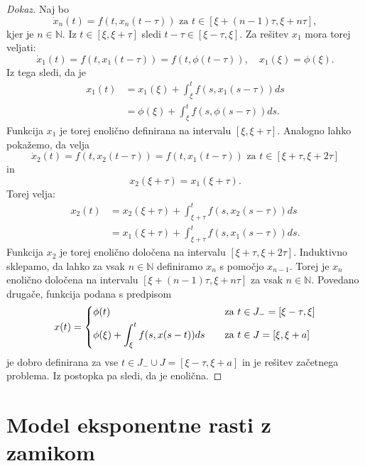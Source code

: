 \documentclass[12pt,a4paper]{amsart}
\theoremstyle{definition} %
\theoremstyle{plain} %
\newcommand{\N}{\mathbb N}
\begin{document}
\begin{proof}[Dokaz]
    Naj bo \[\dot{x}_n(t)=f(t,x_{n}(t-\tau)) \text{ za } t \in [\xi + (n-1)\tau,\xi + n\tau],\]
    kjer je $n \in \N$.
    Iz $t \in [\xi, \xi + \tau]$ sledi $t-\tau \in [\xi - \tau, \xi]$. Za rešitev $x_{1}$ mora torej veljati:
    \[\dot{x}_1(t)=f(t,x_{1}(t-\tau))=f(t,\phi(t-\tau)),\quad x_{1}(\xi)=\phi(\xi).\]
    Iz tega sledi, da je
    \begin{equation*}
        \begin{split}
            x_{1}(t) &= x_{1}(\xi) + \int_{\xi}^{t}f(s, x_{1}(s-\tau))ds \\
            & = \phi(\xi) + \int_{\xi}^{t}f(s,\phi(s-\tau))ds.
        \end{split}      
        \end{equation*}
    Funkcija $x_{1}$ je torej enolično definirana na intervalu $[\xi, \xi + \tau]$. Analogno lahko pokažemo, da velja
    \[\dot{x}_2(t)=f(t,x_{2}(t-\tau))=f(t,x_{1}(t-\tau)) \text{ za } t \in [\xi + \tau, \xi + 2\tau]\] in 
    \[x_{2}(\xi + \tau)=x_{1}(\xi + \tau).\]
    Torej velja:
    \begin{equation*}
        \begin{split}
            x_{2}(t) &= x_{2}(\xi + \tau) + \int_{\xi + \tau}^{t}f(s, x_{2}(s-\tau))ds \\
            & = x_{1}(\xi + \tau) + \int_{\xi + \tau}^{t}f(s, x_{1}(s-\tau))ds.
        \end{split}      
        \end{equation*}
    Funkcija $x_{2}$ je torej enolično določena na intervalu $[\xi + \tau,\xi + 2\tau]$. Induktivno sklepamo, da lahko za vsak 
    $n \in \N$ definiramo $x_{n}$ s pomočjo $x_{n-1}$. Torej je $x_{n}$ enolično določena na intervalu 
    $[\xi + (n-1)\tau, \xi + n\tau]$ za vsak $n \in \N$. Povedano drugače, funkcija podana s predpisom
    \[
        x(t) =
        \begin{dcases}
            \phi(t) &\quad \text{za  } t \in J_{-}=[\xi - \tau, \xi] \\
            \phi(\xi) + \int_{\xi}^{t}f(s,x(s-t))ds &\quad \text{za  } t \in J=[\xi, \xi +a] \\
        \end{dcases}
    \]
    je dobro definirana za vse $t \in J_{-} \cup J = [\xi - \tau, \xi + a]$ in je rešitev začetnega problema. Iz 
    postopka pa sledi, da je enolična.
\end{proof}

\section{Model eksponentne rasti z zamikom}
\end{document}
